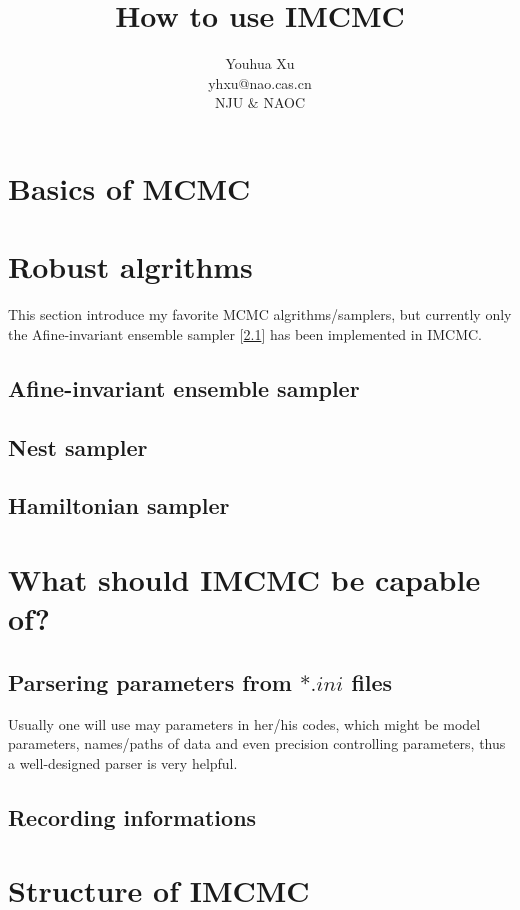 \documentclass[11pt,a4]{paper}
\title{How to use IMCMC}
\author{Youhua Xu\\
	yhxu@nao.cas.cn\\
	NJU $\&$ NAOC}
\begin{document}
\maketitle


\tableofcontents

\begin{multicols}{2}

\section{Basics of MCMC}

\section{Robust algrithms}
This section introduce my favorite MCMC algrithms/samplers, but currently only the
Afine-invariant ensemble sampler [\ref{sec:ensemble}] has been implemented in IMCMC.

\subsection{Afine-invariant ensemble sampler} \label{sec:ensemble}

\subsection{Nest sampler}

\subsection{Hamiltonian sampler}

\section{What should IMCMC be capable of?}

\subsection{Parsering parameters from $*.ini$ files}
Usually one will use may parameters in her/his codes, which might be model parameters, names/paths
of data and even precision controlling parameters, thus a well-designed parser is very helpful.

\subsection{Recording informations}

\section{Structure of IMCMC}


\end{multicols}
\end{document}
